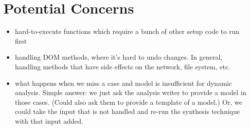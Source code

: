 \documentclass[]{article}
\begin{document}
\section*{Potential Concerns}

\begin{itemize}
  \item hard-to-execute functions which require a bunch of other setup code to
  run first
  \item handling DOM methods, where it's hard to undo changes.  In general,
  handling methods that have side effects on the network, file system, etc.
  \item what happens when we miss a case and model is insufficient for dynamic
  analysis.  Simple answer: we just ask the analysis writer to provide a model in
  those cases.  (Could also ask them to provide a template of a model.)  Or, we
  could take the input that is not handled and re-run the synthesis technique with
  that input added.
\end{itemize}











% 
% 
\end{document}
